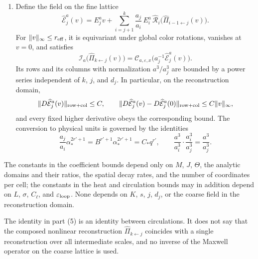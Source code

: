 \begin{theorem}
\begin{enumerate}
\[\]
for rows and for columns with the normalization $a_i^3/a_j^3$. Derivatives with a distinguished input are bounded by derivatives of the same series, with the same spatial decay rate.
\item Define the field on the fine lattice
\[
 \widehat{\mathcal E}_j^a(v)=E_j^av+\sum_{i=j+1}^k\frac{a_j}{a_i}\,E_i^a\,\widehat{\mathcal R}_i\bigl(\widehat\Pi_{i-1\leftarrow j}(v)\bigr).
\]
For $\|v\|_\infty\le r_{\rm eff}$, it is equivariant under global color rotations, vanishes at $v=0$, and satisfies
\[
 \mathcal I_a\bigl(\widehat\Pi_{k\leftarrow j}(v)\bigr)=\mathscr C_{a,\varepsilon,x}\bigl(a_j^{-1}\widehat{\mathcal E}_j^a(v)\bigr).
\]
Its rows and its columns with normalization $a^3/a_j^3$ are bounded by a power series independent of $k$, $j$, and $d_j$. In particular, on the reconstruction domain,
\[
 \|D\widehat{\mathcal E}_j^a(v)\|_{\rm row+col}\le C,\qquad \|D\widehat{\mathcal E}_j^a(v)-D\widehat{\mathcal E}_j^a(0)\|_{\rm row+col}\le C\|v\|_\infty,
\]
and every fixed higher derivative obeys the corresponding bound. The conversion to physical units is governed by the identities
\[
 \frac{a_j}{a_i}\alpha_*^{2r'+1}=B^{r'+1}\alpha_*^{2r'+1}=C_*q^{r'},\qquad \frac{a^3}{a_i^3}\cdot\frac{a_i^3}{a_j^3}=\frac{a^3}{a_j^3}.
\]
\end{enumerate}
The constants in the coefficient bounds depend only on $M$, $J$, $\Theta$, the analytic domains and their ratios, the spatial decay rates, and the number of coordinates per cell; the constants in the heat and circulation bounds may in addition depend on $L$, $\sigma$, $C_\ell$, and $\varepsilon_{\rm loop}$. None depends on $K$, $s$, $j$, $d_j$, or the coarse field in the reconstruction domain.
\end{theorem}

\begin{remark}\label{ch28:rem:circulation-only}
The identity in part (5) is an identity between circulations. It does not say that the composed nonlinear reconstruction $\widehat\Pi_{k\leftarrow j}$ coincides with a single reconstruction over all intermediate scales, and no inverse of the Maxwell operator on the coarse lattice is used.
\end{remark}

